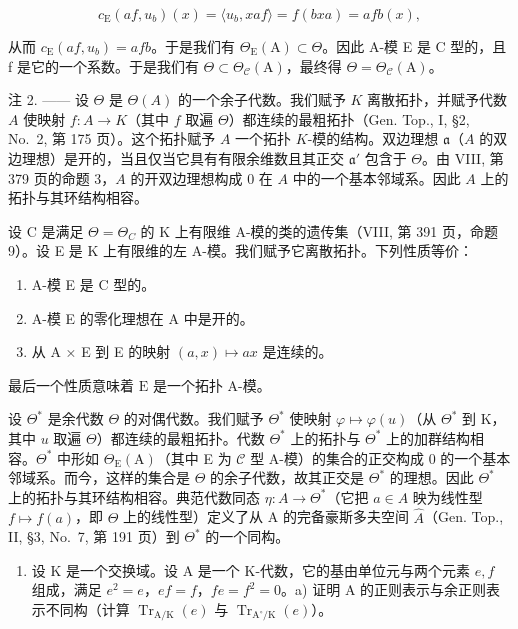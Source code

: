 \[
c _ {\mathrm{E}} (a f, u _ {b}) (x) = \langle u _ {b}, x a f \rangle = f (b x a) = a f b (x),
\]

从而 \(c_{\mathrm{E}}(af, u_{b}) = afb\)。于是我们有 \(\Theta_{\mathrm{E}}(\mathrm{A}) \subset \Theta\)。因此 A-模 E 是 C 型的，且 f 是它的一个系数。于是我们有 \(\Theta \subset \Theta_{\mathcal{C}}(\mathrm{A})\)，最终得 \(\Theta = \Theta_{\mathcal{C}}(\mathrm{A})\)。

注 2. —— 设 \(\Theta\) 是 \(\Theta(A)\) 的一个余子代数。我们赋予 \(K\) 离散拓扑，并赋予代数 \(A\) 使映射 \(f: A \to K\)（其中 \(f\) 取遍 \(\Theta\)）都连续的最粗拓扑（Gen. Top., I, §2, No.~2, 第 175 页）。这个拓扑赋予 \(A\) 一个拓扑 \(K\)-模的结构。双边理想 \(\mathfrak{a}\)（\(A\) 的双边理想）是开的，当且仅当它具有有限余维数且其正交 \(\mathfrak{a}'\) 包含于 \(\Theta\)。由 VIII, 第 379 页的命题 3，\(A\) 的开双边理想构成 \(0\) 在 \(A\) 中的一个基本邻域系。因此 \(A\) 上的拓扑与其环结构相容。

设 C 是满足 \(\Theta = \Theta_{C}\) 的 K 上有限维 A-模的类的遗传集（VIII, 第 391 页，命题 9）。设 E 是 K 上有限维的左 A-模。我们赋予它离散拓扑。下列性质等价：

\begin{enumerate}
\def\labelenumi{(\roman{enumi})}
\item
  A-模 E 是 C 型的。
\item
  A-模 E 的零化理想在 A 中是开的。
\item
  从 A × E 到 E 的映射 \((a, x) \mapsto ax\) 是连续的。
\end{enumerate}

最后一个性质意味着 \(\mathrm{E}\) 是一个拓扑 A-模。

设 \(\Theta^{*}\) 是余代数 \(\Theta\) 的对偶代数。我们赋予 \(\Theta^{*}\) 使映射 \(\varphi \mapsto \varphi(u)\)（从 \(\Theta^{*}\) 到 K，其中 \(u\) 取遍 \(\Theta\)）都连续的最粗拓扑。代数 \(\Theta^{*}\) 上的拓扑与 \(\Theta^{*}\) 上的加群结构相容。\(\Theta^{*}\) 中形如 \(\Theta_{\mathrm{E}}(\mathrm{A})\)（其中 E 为 \(\mathcal{C}\) 型 A-模）的集合的正交构成 0 的一个基本邻域系。而今，这样的集合是 \(\Theta\) 的余子代数，故其正交是 \(\Theta^{*}\) 的理想。因此 \(\Theta^{*}\) 上的拓扑与其环结构相容。典范代数同态 \(\eta: A \to \Theta^{*}\)（它把 \(a \in A\) 映为线性型 \(f \mapsto f(a)\)，即 \(\Theta\) 上的线性型）定义了从 A 的完备豪斯多夫空间 \(\widehat{A}\)（Gen. Top., II, §3, No.~7, 第 191 页）到 \(\Theta^{*}\) 的一个同构。


\begin{enumerate}
\def\labelenumi{\arabic{enumi})}
\tightlist
\item
  设 \(\mathrm{K}\) 是一个交换域。设 \(\mathrm{A}\) 是一个 K-代数，它的基由单位元与两个元素 \(e, f\) 组成，满足 \(e^2 = e\)，\(ef = f\)，\(fe = f^2 = 0\)。a) 证明 \(\mathrm{A}\) 的正则表示与余正则表示不同构（计算 \(\operatorname{Tr}_{\mathrm{A / K}}(e)\) 与 \(\operatorname{Tr}_{\mathrm{A}^{\circ} / \mathrm{K}}(e)\)）。
\end{enumerate}

